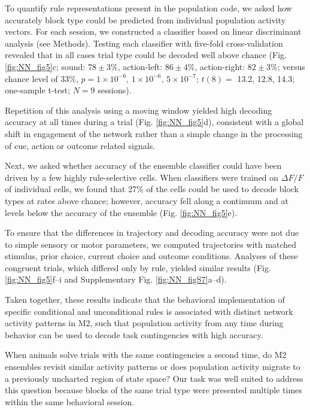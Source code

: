 To quantify rule representations present in the population code, we asked how accurately block type could be predicted from individual population activity vectors. For each session, we constructed a classifier based on linear discriminant analysis (see Methods). Testing each classifier with five-fold cross-validation revealed that in all cases trial type could be decoded well above chance (Fig. \ref{fig:NN_fig5}c; sound: $78 \pm 3\%$, action-left: $86 \pm 4\%$, action-right: $82 \pm 3\%$; versus chance level of 33\%, $p = 1 \times 10^{-6}$, $1 \times 10^{-6}$, $5 \times 10^{-7}$; $t(8) = $ 13.2, 12.8, 14.3; one-sample t-test; $N = 9$ sessions). 

Repetition of this analysis using a moving window yielded high decoding accuracy at all times during a trial (Fig. \ref{fig:NN_fig5}d), consistent with a global shift in engagement of the network rather than a simple change in the processing of cue, action or outcome related signals. 

Next, we asked whether accuracy of the ensemble classifier could have been driven by a few highly rule-selective cells. When classifiers were trained on $\Delta F/F$ of individual cells, we found that 27\% of the cells could be used to decode block types at rates above chance; however, accuracy fell along a continuum and at levels below the accuracy of the ensemble (Fig. \ref{fig:NN_fig5}e). 

To ensure that the differences in trajectory and decoding accuracy were not due to simple sensory or motor parameters, we computed trajectories with matched stimulus, prior choice, current choice and outcome conditions. Analyses of these congruent trials, which differed only by rule, yielded similar results (Fig. \ref{fig:NN_fig5}f--i and Supplementary Fig. \ref{fig:NN_figS7}a--d). 

Taken together, these results indicate that the behavioral implementation of specific conditional and unconditional rules is associated with distinct network activity patterns in M2, such that population activity from any time during behavior can be used to decode task contingencies with high accuracy.

When animals solve trials with the same contingencies a second time, do M2 ensembles revisit similar activity patterns or does population activity migrate to a previously uncharted region of state space? Our task was well suited to address this question because blocks of the same trial type were presented multiple times within the same behavioral session. 

